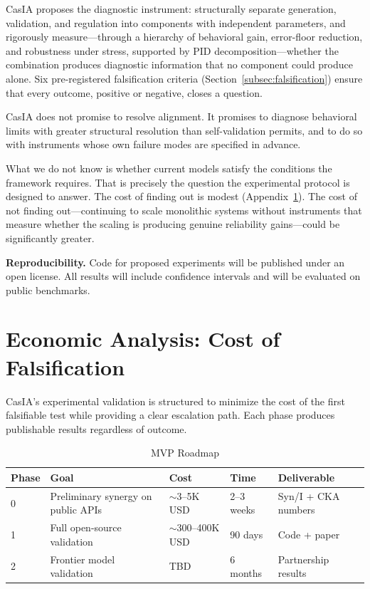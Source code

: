 \documentclass[11pt,a4paper]{article}
\theoremstyle{definition}
\begin{document}
CasIA proposes the diagnostic instrument: structurally separate generation, validation, and regulation into components with independent parameters, and rigorously measure---through a hierarchy of behavioral gain, error-floor reduction, and robustness under stress, supported by PID decomposition---whether the combination produces diagnostic information that no component could produce alone. Six pre-registered falsification criteria (Section~\ref{subsec:falsification}) ensure that every outcome, positive or negative, closes a question.

CasIA does not promise to resolve alignment. It promises to diagnose behavioral limits with greater structural resolution than self-validation permits, and to do so with instruments whose own failure modes are specified in advance.

What we do not know is whether current models satisfy the conditions the framework requires. That is precisely the question the experimental protocol is designed to answer. The cost of finding out is modest (Appendix~\ref{app:economics}). The cost of not finding out---continuing to scale monolithic systems without instruments that measure whether the scaling is producing genuine reliability gains---could be significantly greater.

\medskip
\noindent\textbf{Reproducibility.} Code for proposed experiments will be published under an open license. All results will include confidence intervals and will be evaluated on public benchmarks.


\appendix

\section{Economic Analysis: Cost of Falsification}
\label{app:economics}

CasIA's experimental validation is structured to minimize the cost of the first falsifiable test while providing a clear escalation path. Each phase produces publishable results regardless of outcome.

\begin{table}[ht]
\centering
\caption{MVP Roadmap}
\label{tab:roadmap}
\begin{tabular}{@{}lllll@{}}
\toprule
\textbf{Phase} & \textbf{Goal} & \textbf{Cost} & \textbf{Time} & \textbf{Deliverable} \\
\midrule
0 & Preliminary synergy on public APIs & $\sim$3--5K USD & 2--3 weeks & Syn/I + CKA numbers \\
1 & Full open-source validation & $\sim$300--400K USD & 90 days & Code + paper \\
2 & Frontier model validation & TBD & 6 months & Partnership results \\
\bottomrule
\end{tabular}
\end{table}
\end{document}
